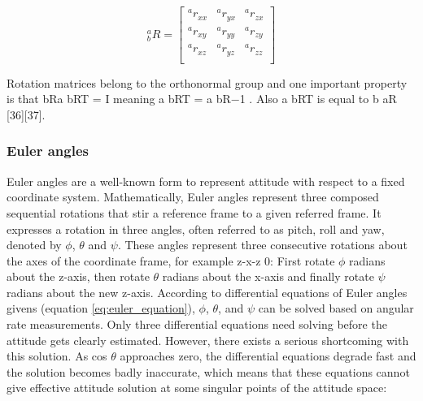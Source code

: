 \begin{equation}
    \textrm{$_{b}^{a}R$}
    =
    \begin{bmatrix}
        \textrm{$^{a}r_{xx}$} & \textrm{$^{a}r_{yx}$} & \textrm{$^{a}r_{zx}$} \\
        \textrm{$^{a}r_{xy}$} & \textrm{$^{a}r_{yy}$} & \textrm{$^{a}r_{zy}$} \\
        \textrm{$^{a}r_{xz}$} & \textrm{$^{a}r_{yz}$} & \textrm{$^{a}r_{zz}$} \\
    \end{bmatrix}
    \label{eq:axes_frames}
\end{equation}

Rotation matrices belong to the orthonormal group and one important property is that bRa bRT = I meaning a bRT = a bR−1 . Also a bRT is equal to b aR [36][37].

\subsubsection{Euler angles}

Euler angles are a well-known form to represent attitude with respect to a fixed coordinate system. Mathematically, Euler angles represent three composed sequential rotations that stir a reference frame to a given referred frame. It expresses a rotation in three angles, often referred to as pitch, roll and yaw, denoted by $\phi$, $\theta$ and $\psi$. These angles represent three consecutive rotations about the axes of the coordinate frame, for example z-x-z 0: First rotate $\phi$ radians about the z-axis, then rotate $\theta$ radians about the x-axis and finally rotate $\psi$ radians about the new z-axis. According to differential equations of Euler angles givens (equation \ref{eq:euler_equation}), $\phi$, $\theta$, and $\psi$ can be solved based on angular rate measurements. Only three differential equations need solving before the attitude gets clearly estimated. However, there exists a serious shortcoming with this solution. As cos $\theta$ approaches zero, the differential equations degrade fast and the solution becomes badly inaccurate, which means that these equations cannot give effective attitude solution at some singular points of the attitude space:


